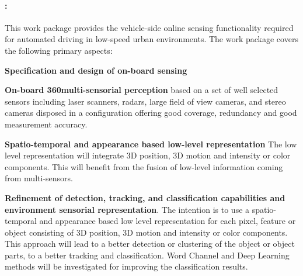 \paragraph{\textbf{\WPPerception: \WPPerceptionTitle}}
This work package provides the vehicle-side online sensing functionality required for automated driving in low-speed urban environments. The work package covers the following primary aspects:
\begin{denseItemize}
\item \textbf{Specification and design of on-board sensing}
\item \textbf{On-board 360\degree \space multi-sensorial perception} based on a set of well selected sensors including laser scanners, radars, large field of view cameras, and stereo cameras disposed in a configuration offering good coverage, redundancy and good measurement accuracy.

\item \textbf{Spatio-temporal and appearance based low-level representation} The low level representation will integrate 3D position, 3D motion and intensity or color components. This will benefit from the fusion of low-level information coming from multi-sensors.

\item \textbf{Refinement of detection, tracking, and classification capabilities and environment sensorial representation}. The intention is to use a spatio-temporal and appearance based low level representation for each pixel, feature or object consisting of 3D position, 3D motion and intensity or color components. This approach will lead to a better detection or clustering of the object or object parts, to a better tracking and classification. Word Channel and Deep Learning methods will be investigated for improving the classification results.
\end{denseItemize}


